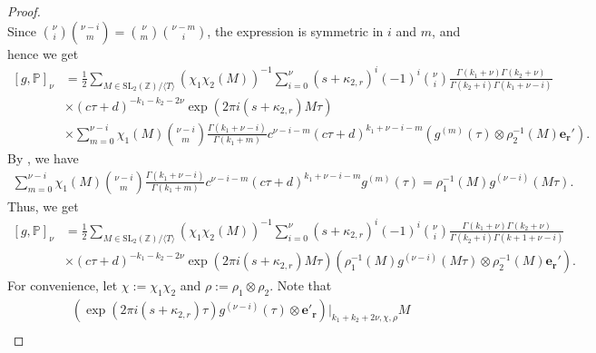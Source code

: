 \documentclass[11pt]{amsart}
\theoremstyle{definition}
\theoremstyle{remark}
\numberwithin{equation}{section}
\renewcommand{\(}{\left(}
\renewcommand{\)}{\right)}
\begin{document}
\begin{proof}
\begin{equation*}
    \end{equation*}
    Since $\binom{\nu}{i}\binom{\nu-i}{m}=\binom{\nu}{m}\binom{\nu-m}{i}$, the expression is symmetric in $i$ and $m$, and hence we get
    \begin{equation*}
        \begin{aligned}
            [g,\mathbb{P}]_{\nu}&=\frac{1}{2}\sum_{M\in \mathrm{SL}_{2}(\mathbb{Z})/\langle T \rangle } (\chi_1\chi_2(M))^{-1} \sum_{i=0}^{\nu}  (s+\kappa_{2,r})^{i}(-1)^{i}\binom{\nu}{i} \frac{\Gamma(k_1+\nu)\Gamma(k_2+\nu)}{\Gamma(k_2+i)\Gamma(k_1+\nu-i)}\\
            &\times (c\tau+d)^{-k_1-k_2-2\nu}\exp(2\pi i (s+\kappa_{2,r})M\tau)\\
            &\times\sum_{m=0}^{\nu-i} \chi_1(M) \binom{\nu-i}{m} \frac{\Gamma(k_1+\nu-i)}{\Gamma(k_1+m)}c^{\nu-i-m}(c\tau+d)^{k_1+\nu-i-m}(g^{(m)}(\tau)\otimes \rho_2^{-1}(M) \mathbf{e_r'}).
        \end{aligned}
    \end{equation*}
    By \cite[(76)]{ZA}, we have 
    \begin{equation*}
        \begin{aligned}
            \sum_{m=0}^{\nu-i}\chi_1(M) \binom{\nu-i}{m} \frac{\Gamma(k_1+\nu-i)}{\Gamma(k_1+m)}c^{\nu-i-m}(c\tau+d)^{k_1+\nu-i-m}g^{(m)}(\tau) = \rho_1^{-1}(M)g^{(\nu-i)}(M\tau).
        \end{aligned}
    \end{equation*}
    Thus, we get 
    \begin{equation*}
        \begin{aligned}
            [g,\mathbb{P}]_{\nu}&=\frac{1}{2}\sum_{M\in \mathrm{SL}_{2}(\mathbb{Z})/\langle T \rangle } (\chi_1\chi_2(M))^{-1} \sum_{i=0}^{\nu}  (s+\kappa_{2,r})^{i}(-1)^{i}\binom{\nu}{i} \frac{\Gamma(k_1+\nu)\Gamma(k_2+\nu)}{\Gamma(k_2+i)\Gamma(k+1+\nu-i)}\\
            &\times (c\tau+d)^{-k_1-k_2-2\nu}\exp(2\pi i (s+\kappa_{2,r})M\tau)\left(\rho_1^{-1}(M)g^{(\nu-i)}(M\tau)\otimes \rho_2^{-1}(M) \mathbf{e_r'} \right).
        \end{aligned}
    \end{equation*}
    For convenience, let $\chi:=\chi_1\chi_2$ and $\rho:=\rho_1\otimes \rho_2$. 
    Note that 
    \begin{equation*}
        \begin{aligned}
            &\left(\exp(2\pi i (s+\kappa_{2,r})\tau)g^{(\nu-i)}(\tau)\otimes \mathbf{e'_r} \right)|_{k_1+k_2+2\nu,\chi,\rho}M\\

\end{aligned}
\end{equation*}
\end{proof}
\end{document}
